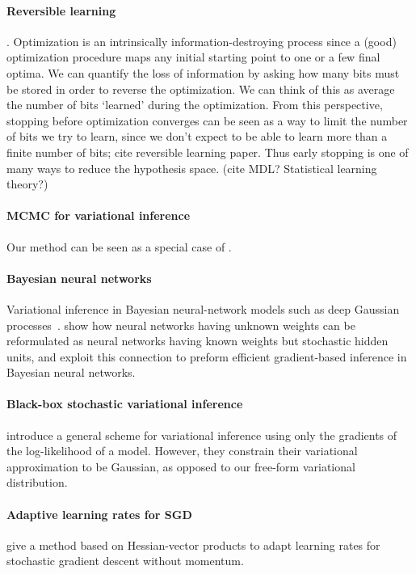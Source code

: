 \documentclass[]{article}
\begin{document}
\paragraph{Reversible learning} \citet{MacDuvAda2015hyper}. Optimization is an
intrinsically information-destroying process since a (good) optimization
procedure maps any initial starting point to one or a few final optima. We can
quantify the loss of information by asking how many bits must be stored in order
to reverse the optimization. We can think of this as average the number of bits
`learned' during the optimization. From this perspective, stopping before optimization
converges can be seen as a way to limit the number of bits we try to learn,
since we don't expect to be able to learn more than a finite number of bits; cite reversible
learning paper. Thus early stopping is one of many ways to reduce the hypothesis
space. (cite MDL? Statistical learning theory?)

\paragraph{MCMC for variational inference}
Our method can be seen as a special case of \citet{Bridging14}.


\paragraph{Bayesian neural networks}
Variational inference in Bayesian neural-network models such as deep Gaussian processes~\citep{deepGPVar14}.
\citet{kingma2014efficient} show how neural networks having unknown weights can be reformulated as neural networks having known weights but stochastic hidden units, and exploit this connection to preform efficient gradient-based inference in Bayesian neural networks.


\paragraph{Black-box stochastic variational inference}
\citet{alp2014blackbox} introduce a general scheme for variational inference using only the gradients of the log-likelihood of a model.
However, they constrain their variational approximation to be Gaussian, as opposed to our free-form variational distribution.

\paragraph{Adaptive learning rates for SGD}
\citet{courbariaux2014low} give a method based on Hessian-vector products to adapt learning rates for stochastic gradient descent without momentum.
\end{document}
